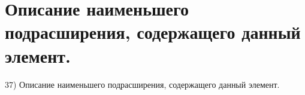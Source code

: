 \section{
 Описание наименьшего подрасширения, содержащего данный элемент.
}

37) Описание наименьшего подрасширения, содержащего данный элемент.
